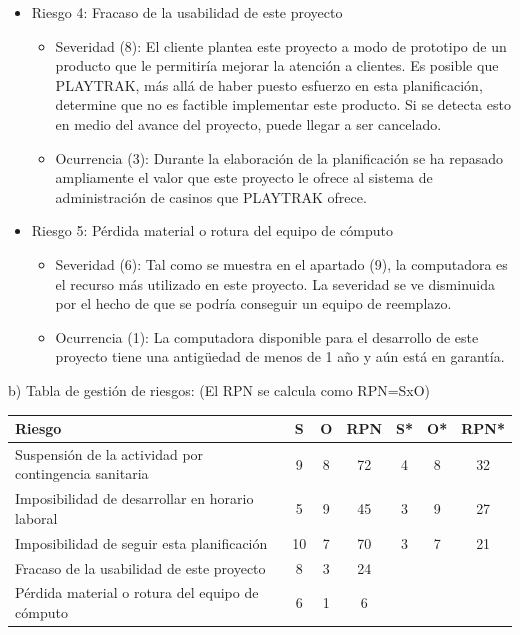 \documentclass[11pt]{charter}
\begin{document}
\begin{itemize}
  \item Riesgo 4: Fracaso de la usabilidad de este proyecto
  \begin{itemize}
    \item Severidad (8): El cliente plantea este proyecto a modo de prototipo de un producto que le permitiría mejorar 
    la atención a clientes. Es posible que PLAYTRAK, más allá de haber puesto esfuerzo en esta planificación, 
    determine que no es factible implementar este producto. Si se detecta esto en medio del avance del proyecto, 
    puede llegar a ser cancelado.
    \item Ocurrencia (3): Durante la elaboración de la planificación se ha repasado ampliamente el 
    valor que este proyecto le ofrece al sistema de administración de casinos que PLAYTRAK ofrece.
  \end{itemize}
\end{itemize}
 
\begin{itemize}
  \item Riesgo 5: Pérdida material o rotura del equipo de cómputo
  \begin{itemize}
    \item Severidad (6): Tal como se muestra en el apartado (9), la computadora es el recurso más utilizado en este proyecto. 
    La severidad se ve disminuida por el hecho de que se podría conseguir un equipo de reemplazo.
    \item Ocurrencia (1): La computadora disponible para el desarrollo de este proyecto tiene una antigüedad 
    de menos de 1 año y aún está en garantía.
  \end{itemize}
\end{itemize}

b) Tabla de gestión de riesgos:      (El RPN se calcula como RPN=SxO)

\begin{table}[htpb]
\centering
\begin{tabularx}{\linewidth}{@{}|X|c|c|c|c|c|c|@{}}
\hline
\rowcolor[HTML]{C0C0C0} 
Riesgo & S & O & RPN & S* & O* & RPN* \\ \hline
Suspensión de la actividad por contingencia sanitaria & 9  & 8 & 72  & 4 & 8 & 32  \\ \hline
Imposibilidad de desarrollar en horario laboral & 5  & 9 & 45  & 3 & 9 & 27  \\ \hline
Imposibilidad de seguir esta planificación & 10 & 7 & 70  & 3 & 7 & 21  \\ \hline
Fracaso de la usabilidad de este proyecto & 8  & 3 & 24  &   &   &     \\ \hline
Pérdida material o rotura del equipo de cómputo & 6  & 1 & 6   &   &   &     \\ \hline
\end{tabularx}%
\end{table}
\end{document}
